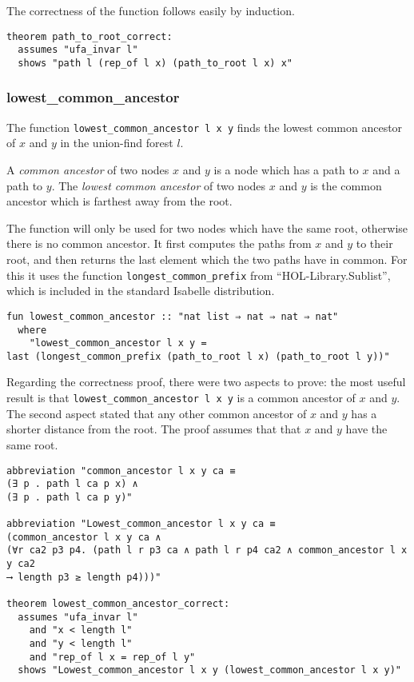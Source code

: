 The correctness of the function follows easily by induction.

\begin{lstlisting}
theorem path_to_root_correct:
  assumes "ufa_invar l"
  shows "path l (rep_of l x) (path_to_root l x) x"
\end{lstlisting}

\subsubsection{lowest\_common\_ancestor}

The function \lstinline{lowest_common_ancestor l x y} finds the lowest common ancestor of $x$ and $y$ in the union-find forest $l$.

\begin{definition}
A \emph{common ancestor} of two nodes $x$ and $y$ is a node which has a path to $x$ and a path to $y$.
The \emph{lowest common ancestor} of two nodes $x$ and $y$ is the common ancestor which is farthest away from the root.
\end{definition}

The function will only be used for two nodes which have the same root, otherwise there is no common ancestor. It first computes the paths from $x$ and $y$ to their root, and then returns the last element which the two paths have in common. For this it uses the function \lstinline{longest_common_prefix} from ``HOL-Library.Sublist'', which is included in the standard Isabelle distribution.

\begin{lstlisting}
fun lowest_common_ancestor :: "nat list ⇒ nat ⇒ nat ⇒ nat"
  where
    "lowest_common_ancestor l x y =
last (longest_common_prefix (path_to_root l x) (path_to_root l y))"
\end{lstlisting}

Regarding the correctness proof, there were two aspects to prove: the most useful result is that \lstinline{lowest_common_ancestor l x y} is a common ancestor of $x$ and $y$. The second aspect stated that any other common ancestor of $x$ and $y$ has a shorter distance from the root. The proof assumes that that $x$ and $y$ have the same root.

\begin{lstlisting}
abbreviation "common_ancestor l x y ca ≡
(∃ p . path l ca p x) ∧
(∃ p . path l ca p y)"

abbreviation "Lowest_common_ancestor l x y ca ≡
(common_ancestor l x y ca ∧
(∀r ca2 p3 p4. (path l r p3 ca ∧ path l r p4 ca2 ∧ common_ancestor l x y ca2
⟶ length p3 ≥ length p4)))"

theorem lowest_common_ancestor_correct:
  assumes "ufa_invar l"
    and "x < length l"
    and "y < length l"
    and "rep_of l x = rep_of l y"
  shows "Lowest_common_ancestor l x y (lowest_common_ancestor l x y)"
\end{lstlisting}

